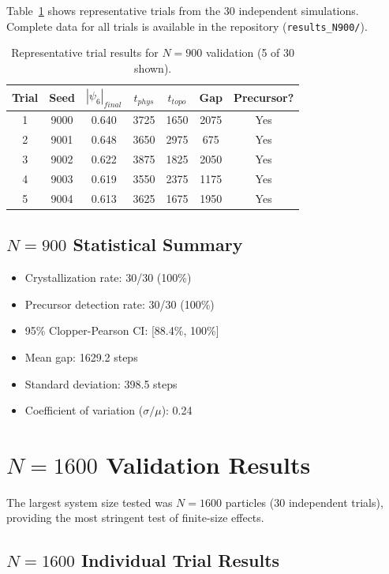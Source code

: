 \documentclass[11pt]{article}
\begin{document}
Table~\ref{tab:n900trials} shows representative trials from the 30 independent simulations. Complete data for all trials is available in the repository (\texttt{results\_N900/}).

\begin{table}[h]
\centering
\caption{Representative trial results for $N=900$ validation (5 of 30 shown).}
\label{tab:n900trials}
\begin{tabular}{ccccccc}
\toprule
\textbf{Trial} & \textbf{Seed} & \textbf{$|\psi_6|_{final}$} & \textbf{$t_{phys}$} & \textbf{$t_{topo}$} & \textbf{Gap} & \textbf{Precursor?} \\
\midrule
1 & 9000 & 0.640 & 3725 & 1650 & 2075 & Yes \\
2 & 9001 & 0.648 & 3650 & 2975 & 675 & Yes \\
3 & 9002 & 0.622 & 3875 & 1825 & 2050 & Yes \\
4 & 9003 & 0.619 & 3550 & 2375 & 1175 & Yes \\
5 & 9004 & 0.613 & 3625 & 1675 & 1950 & Yes \\
\bottomrule
\end{tabular}
\end{table}

\subsection{$N=900$ Statistical Summary}

\begin{itemize}
    \item Crystallization rate: 30/30 (100\%)
    \item Precursor detection rate: 30/30 (100\%)
    \item 95\% Clopper-Pearson CI: [88.4\%, 100\%]
    \item Mean gap: 1629.2 steps
    \item Standard deviation: 398.5 steps
    \item Coefficient of variation ($\sigma/\mu$): 0.24
\end{itemize}

\section{$N=1600$ Validation Results}

The largest system size tested was $N=1600$ particles (30 independent trials), providing the most stringent test of finite-size effects.

\subsection{$N=1600$ Individual Trial Results}
\end{document}
